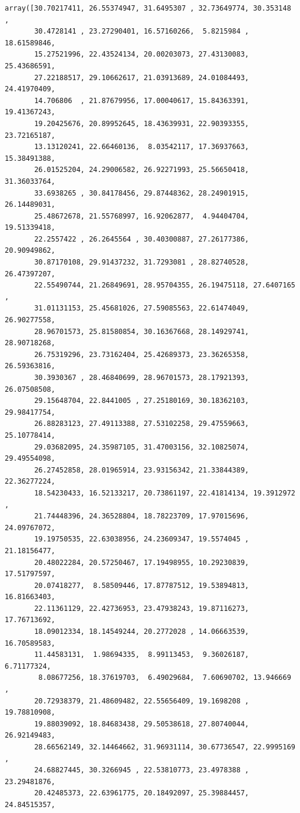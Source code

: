 \documentclass[11pt]{article}
\begin{document}
    
    \begin{Verbatim}[commandchars=\\\{\}]
array([30.70217411, 26.55374947, 31.6495307 , 32.73649774, 30.353148  ,
       30.4728141 , 23.27290401, 16.57160266,  5.8215984 , 18.61589846,
       15.27521996, 22.43524134, 20.00203073, 27.43130083, 25.43686591,
       27.22188517, 29.10662617, 21.03913689, 24.01084493, 24.41970409,
       14.706806  , 21.87679956, 17.00040617, 15.84363391, 19.41367243,
       19.20425676, 20.89952645, 18.43639931, 22.90393355, 23.72165187,
       13.13120241, 22.66460136,  8.03542117, 17.36937663, 15.38491388,
       26.01525204, 24.29006582, 26.92271993, 25.56650418, 31.36033764,
       33.6938265 , 30.84178456, 29.87448362, 28.24901915, 26.14489031,
       25.48672678, 21.55768997, 16.92062877,  4.94404704, 19.51339418,
       22.2557422 , 26.2645564 , 30.40300887, 27.26177386, 20.90949862,
       30.87170108, 29.91437232, 31.7293081 , 28.82740528, 26.47397207,
       22.55490744, 21.26849691, 28.95704355, 26.19475118, 27.6407165 ,
       31.01131153, 25.45681026, 27.59085563, 22.61474049, 26.90277558,
       28.96701573, 25.81580854, 30.16367668, 28.14929741, 28.90718268,
       26.75319296, 23.73162404, 25.42689373, 23.36265358, 26.59363816,
       30.3930367 , 28.46840699, 28.96701573, 28.17921393, 26.07508508,
       29.15648704, 22.8441005 , 27.25180169, 30.18362103, 29.98417754,
       26.88283123, 27.49113388, 27.53102258, 29.47559663, 25.10778414,
       29.03682095, 24.35987105, 31.47003156, 32.10825074, 29.49554098,
       26.27452858, 28.01965914, 23.93156342, 21.33844389, 22.36277224,
       18.54230433, 16.52133217, 20.73861197, 22.41814134, 19.3912972 ,
       21.74448396, 24.36528804, 18.78223709, 17.97015696, 24.09767072,
       19.19750535, 22.63038956, 24.23609347, 19.5574045 , 21.18156477,
       20.48022284, 20.57250467, 17.19498955, 10.29230839, 17.51797597,
       20.07418277,  8.58509446, 17.87787512, 19.53894813, 16.81663403,
       22.11361129, 22.42736953, 23.47938243, 19.87116273, 17.76713692,
       18.09012334, 18.14549244, 20.2772028 , 14.06663539, 16.70589583,
       11.44583131,  1.98694335,  8.99113453,  9.36026187,  6.71177324,
        8.08677256, 18.37619703,  6.49029684,  7.60690702, 13.946669  ,
       20.72938379, 21.48609482, 22.55656409, 19.1698208 , 19.78810908,
       19.88039092, 18.84683438, 29.50538618, 27.80740044, 26.92149483,
       28.66562149, 32.14464662, 31.96931114, 30.67736547, 22.9995169 ,
       24.68827445, 30.3266945 , 22.53810773, 23.4978388 , 23.29481876,
       20.42485373, 22.63961775, 20.18492097, 25.39884457, 24.84515357,

\end{Verbatim}
\end{document}
